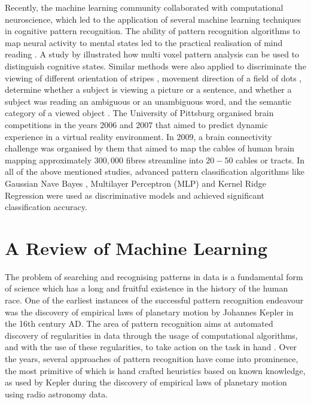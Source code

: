 Recently, the machine learning community collaborated with computational neuroscience, which led to the application of several machine learning techniques in cognitive pattern recognition. The ability of pattern recognition algorithms to map neural activity to mental states led to the practical realisation of mind reading \citep{norman2006beyond}. A study by \citet{haxby2001distributed} illustrated how multi voxel pattern analysis can be used to distinguish cognitive states. Similar methods were also applied to discriminate the viewing of different orientation of stripes \citep{haynes2005predicting, kamitani2005decoding}, movement direction of a field of dots \citep{kamitani2006decoding}, determine whether a subject is viewing a picture or a sentence, and whether a subject was reading an ambiguous or an unambiguous word, and the semantic category of a viewed object \citep{mitchell2004learning}. The University of Pittsburg organised brain competitions in the years $2006$ and $2007$ that aimed to predict dynamic experience in a virtual reality environment. In $2009$, a brain connectivity challenge was organised by them that aimed to map the cables of human brain mapping approximately $300,000$ fibres streamline into $20-50$ cables or tracts. In all of the above mentioned studies, advanced pattern classification algorithms like Gaussian Nave Bayes \citep{mitchell2004learning}, Multilayer Perceptron (MLP) and Kernel Ridge Regression \citep{chu2011kernel} were used as discriminative models and achieved significant classification accuracy.


\section{A Review of Machine Learning}

The problem of searching and recognising patterns in data is a fundamental form of science which has a long and fruitful existence in the history of the human race. One of the earliest instances of the successful pattern recognition endeavour was the discovery of empirical laws of planetary motion by Johannes Kepler in the 16th century AD. The area of pattern recognition aims at automated discovery of regularities in data through the usage of computational algorithms, and with the use of these regularities, to take action on the task in hand \citep{bishop2006pattern}. Over the years, several approaches of pattern recognition have come into prominence, the most primitive of which is hand crafted heuristics based on known knowledge, as used by Kepler during the discovery of empirical laws of planetary motion using radio astronomy data. 

